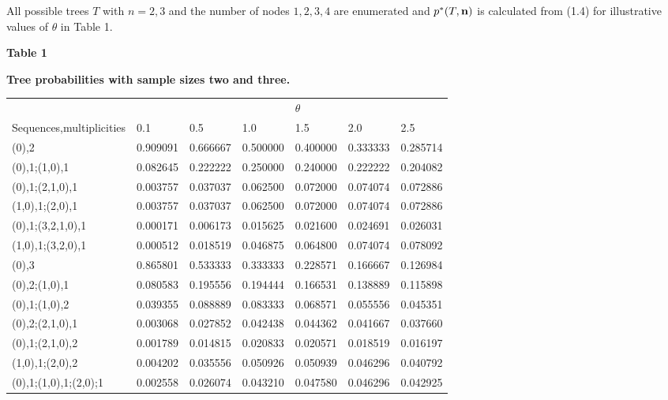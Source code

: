     All possible trees $T$ with $n = 2,3$ and the number of nodes $1,2,3,4$
 are enumerated and $p^*(T,{\bf n})$ is calculated from (1.4) 
for illustrative values
of $\theta$ in Table 1.
\newpage
\vspace{0.5cm}
\begin{Large}
\begin{center}
{\bf Table 1}
\end{center}
\end{Large}
\vspace{0.5cm}
\begin{large}
\begin{center}
{\bf Tree probabilities with sample sizes two and three.}
\end{center}
\end{large}
\begin{small}
\begin{tabular}{lllllll}
& & & &$\theta$ \\
Sequences,multiplicities 
&   0.1  &   0.5  &   1.0  &   1.5  &   2.0  &   2.5 \\ \cline{2-7} 
(0),2             &0.909091 &0.666667 &0.500000 &0.400000 &0.333333 &0.285714 \\
(0),1;(1,0),1     &0.082645 &0.222222 &0.250000 &0.240000 &0.222222 &0.204082 \\
(0),1;(2,1,0),1   &0.003757 &0.037037 &0.062500 &0.072000 &0.074074 &0.072886 \\
(1,0),1;(2,0),1 &0.003757 &0.037037 &0.062500 &0.072000 &0.074074 &0.072886 \\
(0),1;(3,2,1,0),1 &0.000171 &0.006173 &0.015625 &0.021600 &0.024691 &0.026031 \\
(1,0),1;(3,2,0),1 &0.000512 &0.018519 &0.046875 &0.064800 &0.074074 &0.078092 \\
(0),3             &0.865801 &0.533333 &0.333333 &0.228571 &0.166667 &0.126984 \\
(0),2;(1,0),1     &0.080583 &0.195556 &0.194444 &0.166531 &0.138889 &0.115898 \\
(0),1;(1,0),2     &0.039355 &0.088889 &0.083333 &0.068571 &0.055556 &0.045351 \\
(0),2;(2,1,0),1   &0.003068 &0.027852 &0.042438 &0.044362 &0.041667 &0.037660 \\
(0),1;(2,1,0),2   &0.001789 &0.014815 &0.020833 &0.020571 &0.018519 &0.016197 \\
(1,0),1;(2,0),2   &0.004202 &0.035556 &0.050926 &0.050939 &0.046296 &0.040792 \\
(0),1;(1,0),1;(2,0);1
                  &0.002558 &0.026074 &0.043210 &0.047580 &0.046296 &0.042925 \\

\end{tabular}
\end{small}
